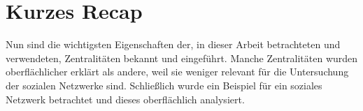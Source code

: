 \section{Kurzes Recap}
Nun sind die wichtigsten Eigenschaften der, in dieser Arbeit betrachteten und verwendeten, Zentralitäten bekannt und eingeführt. Manche Zentralitäten wurden oberflächlicher erklärt als andere, weil sie weniger relevant für die Untersuchung der sozialen Netzwerke sind. Schließlich wurde ein Beispiel für ein soziales Netzwerk betrachtet und dieses oberflächlich analysiert.

